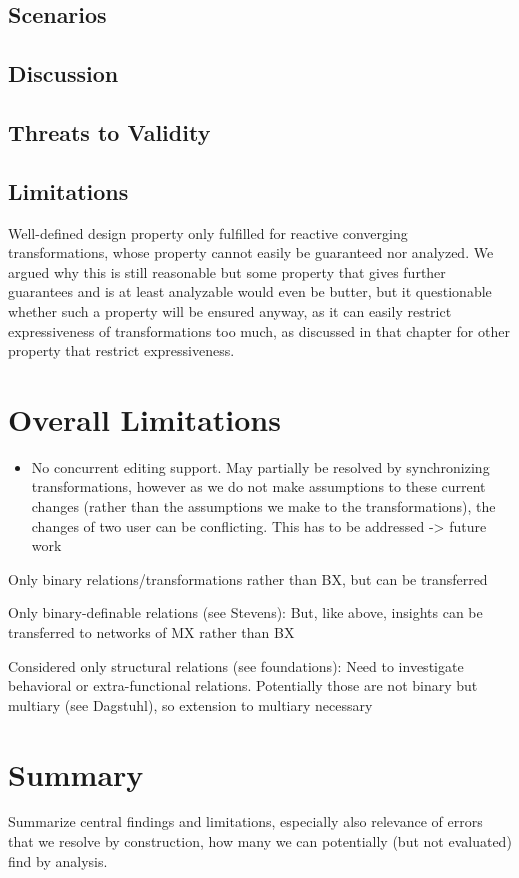 \subsection{Scenarios}


\subsection{Discussion}


\subsection{Threats to Validity}


\subsection{Limitations}
Well-defined design property only fulfilled for reactive converging transformations, whose property cannot easily be guaranteed nor analyzed.
We argued why this is still reasonable but some property that gives further guarantees and is at least analyzable would even be butter, but it questionable whether such a property will be ensured anyway, as it can easily restrict expressiveness of transformations too much, as discussed in that chapter for other property that restrict expressiveness.



\section{Overall Limitations}

\begin{itemize}
    \item No concurrent editing support. May partially be resolved by synchronizing transformations, however as we do not make assumptions to these current changes (rather than the assumptions we make to the transformations), the changes of two user can be conflicting. This has to be addressed -> future work
\end{itemize}

Only binary relations/transformations rather than BX, but can be transferred

Only binary-definable relations (see Stevens): But, like above, insights can be transferred to networks of MX rather than BX

Considered only structural relations (see foundations): Need to investigate behavioral or extra-functional relations. Potentially those are not binary but multiary (see Dagstuhl), so extension to multiary necessary



\section{Summary}

Summarize central findings and limitations, especially also relevance of errors that we resolve by construction, how many we can potentially (but not evaluated) find by analysis.


